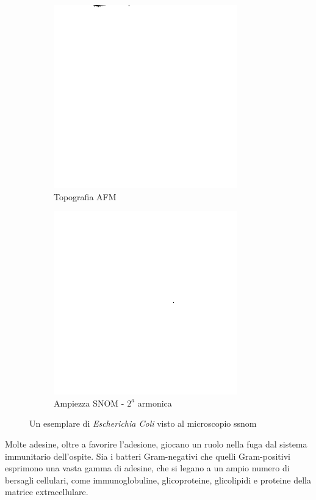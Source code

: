 \documentclass[../main.tex]{subfiles}
\begin{document}
\begin{figure}[h]
	\begin{subfigure}{0.5\linewidth}
		\centering
		\includegraphics[keepaspectratio, width=0.65\linewidth]{images/ecoli_afm.png}
		\caption{Topografia AFM}
	\end{subfigure}
	\begin{subfigure}{0.5\linewidth}
		\centering
		\includegraphics[keepaspectratio, width=0.65\linewidth]{images/ecoli_snom.png}
		\caption{Ampiezza SNOM - $2^{a}$ armonica}
	\end{subfigure}
	\caption[Un esemplare di \textit{Escherichia Coli} visto al microscopio s-SNOM]{
		Un esemplare di \textit{Escherichia Coli} visto al microscopio \acrshort{ssnom} \cite{ssnombacter_data}}
	\label{fig:ecoli}
\end{figure}

Molte adesine, oltre a favorire l'adesione, giocano un ruolo nella fuga dal sistema immunitario dell'ospite. Sia i batteri Gram-negativi che quelli Gram-positivi esprimono una vasta gamma di adesine, che si legano a un ampio numero di bersagli cellulari, come immunoglobuline, glicoproteine, glicolipidi e proteine della matrice extracellulare.\cite{finlay_1997}
\end{document}
